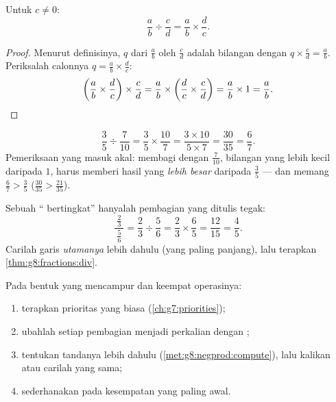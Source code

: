 \begin{theorem}\label{thm:g8:fractions:div}
Untuk $c \neq 0$:
\[
\frac{a}{b} \div \frac{c}{d} = \frac{a}{b} \times \frac{d}{c} .
\]
\end{theorem}

\begin{proof}
Menurut definisinya,  $q$ dari $\frac ab$ oleh $\frac cd$
adalah bilangan dengan $q \times \frac cd = \frac ab$. Periksalah
calonnya $q = \frac ab \times \frac dc$:
\[
\left(\frac ab \times \frac dc\right) \times \frac cd
= \frac ab \times \left(\frac dc \times \frac cd\right)
= \frac ab \times 1 = \frac ab . \qedhere
\]
\end{proof}

\begin{example}\label{ex:g8:fractions:div}
\[
\frac{3}{5} \div \frac{7}{10}
= \frac{3}{5} \times \frac{10}{7}
= \frac{3 \times 10}{5 \times 7}
= \frac{30}{35} = \frac{6}{7}.
\]
Pemeriksaan yang masuk akal: membagi dengan $\frac{7}{10}$, bilangan
yang lebih kecil daripada $1$, harus memberi hasil yang \emph{lebih
besar} daripada $\frac35$ --- dan memang $\frac67 > \frac35$
($\frac{30}{35} > \frac{21}{35}$).
\end{example}

\begin{example}\label{ex:g8:fractions:complex}
Sebuah `` bertingkat'' hanyalah pembagian yang ditulis tegak:
\[
\frac{\ \frac{2}{3}\ }{\ \frac{5}{6}\ }
= \frac{2}{3} \div \frac{5}{6}
= \frac{2}{3} \times \frac{6}{5}
= \frac{12}{15} = \frac{4}{5}.
\]
Carilah garis \emph{utamanya} lebih dahulu (yang paling panjang), lalu
terapkan \cref{thm:g8:fractions:div}.
\end{example}

\begin{method}\label{met:g8:fractions:mixed}
Pada bentuk yang mencampur  dan keempat operasinya:
\begin{enumerate}
  \item terapkan prioritas yang biasa (\cref{ch:g7:priorities});
  \item ubahlah setiap pembagian menjadi perkalian dengan
        ;
  \item tentukan tandanya lebih dahulu
        (\cref{met:g8:negprod:compute}), lalu kalikan atau carilah
         yang sama;
  \item sederhanakan pada kesempatan yang paling awal.
\end{enumerate}
\end{method}

